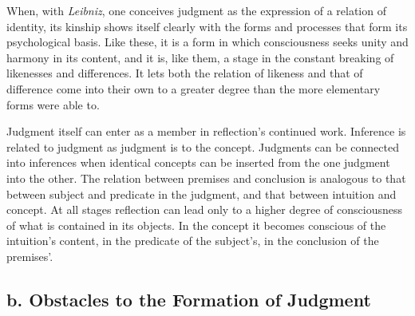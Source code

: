 \documentclass[12pt,a4paper]{book}
\newcommand{\opage}[1]{\marginnote{\footnotesize\textit{[#1]}}}
\begin{document}
When, with \emph{Leibniz}, one conceives judgment as the expression of a
relation of identity, its kinship shows itself clearly with the forms and
processes that form its psychological basis. \opage{74}Like these, it is a form in
which consciousness seeks unity and harmony in its content, and it is,
like them, a stage in the constant breaking of likenesses and
differences. It lets both the relation of likeness and that of difference
come into their own to a greater degree than the more elementary forms
were able to.

Judgment itself can enter as a member in reflection's continued work.
Inference is related to judgment as judgment is to the concept. Judgments
can be connected into inferences when identical concepts can be inserted
from the one judgment into the other. The relation between premises and
conclusion is analogous to that between subject and predicate in the
judgment, and that between intuition and concept. At all stages reflection
can lead only to a higher degree of consciousness of what is contained in
its objects. In the concept it becomes conscious of the intuition's
content, in the predicate of the subject's, in the conclusion of the
premises'.

\subsection*{b. Obstacles to the Formation of Judgment}
\label{ssec:hindringer}
\end{document}

